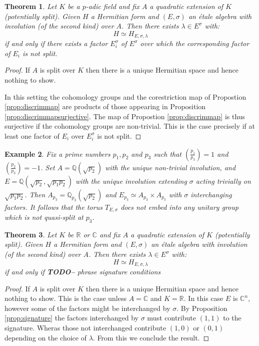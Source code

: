 \documentclass{article}
\theoremstyle{plain}
\newtheorem{theorem}{Theorem}[section]
\newtheorem{example}[theorem]{Example}
\theoremstyle{definition}
\numberwithin{equation}{section}
\newcommand{\RR}{\mathbb{R}}
\newcommand{\CC}{\mathbb{C}}
\newcommand{\QQ}{\mathbb{Q}}
\newcommand{\TODO}[1]{\textbf{TODO-#1}}
\begin{document}
\begin{theorem}
Let $K$ be a $p$-adic field and fix $A$ a quadratic extension of $K$ (potentially split).
Given $H$ a Hermitian form and $(E,\sigma)$ an \'etale algebra with involution (of the second kind) over $A$. Then there exists $\lambda \in E^\sigma$ with:
\[ H \simeq H_{E,\sigma,\lambda} \]
if and only if there exists a factor $E_i^\sigma$ of $E^\sigma$ over which the corresponding factor of $E_i$ is not split.
\end{theorem}
\begin{proof}
If $A$ is split over $K$ then there is a unique Hermitian space and hence nothing to show.

In this setting the cohomology groups and the corestriction map of Propostion \ref{prop:discrimmap} are products of those appearing in Proposition \ref{prop:discrimmapsurjective}. The map of Propostion \ref{prop:discrimmap} is thus surjective if the cohomology groups are non-trivial. This is the case precisely if at least one factor of $E_i$ over $E_i^\sigma$ is not split.
\end{proof}

\begin{example}
Fix a prime numbers $p_1,p_2$ and $p_3$ such that $\left(\tfrac{p_1}{p_3}\right) = 1$ and $\left(\tfrac{p_2}{p_3}\right) = -1$.
Set $A=\QQ(\sqrt{p_2})$ with the unique non-trivial involution, and $E=\QQ(\sqrt{p_2},\sqrt{p_1p_2})$ with the unique involution extending $\sigma$ acting trivially on $\sqrt{p_1p_2}$.
Then $A_{p_3} = \QQ_{p_3}(\sqrt{p_2})$ and $E_{p_3} \simeq A_{p_3} \times A_{p_3}$ with $\sigma$ interchanging factors.
It follows that the torus $T_{E,\sigma}$ does not embed into any unitary group which is not quasi-split at $p_3$.
\end{example}

\begin{theorem}
Let $K$ be $\RR$ or $\CC$ and fix $A$ a quadratic extension of $K$ (potentially split).
Given $H$ a Hermitian form and $(E,\sigma)$ an \'etale algebra with involution (of the second kind) over $A$. Then there exists $\lambda \in E^\sigma$ with:
\[ H \simeq H_{E,\sigma,\lambda} \]
if and only if 
\TODO - phrase signature conditions
\end{theorem}
\begin{proof}
If $A$ is split over $K$ then there is a unique Hermitian space and hence nothing to show.
This is the case unless $A=\CC$ and $K=\RR$. In this case $E$ is $\CC^n$, however some of the factors might be interchanged by $\sigma$.
By Proposition \ref{prop:signature} the factors interchanged by $\sigma$ must contribute $(1,1)$ to the signature.
Wheras those not interchanged contribute $(1,0)$ or $(0,1)$ depending on the choice of $\lambda$.
From this we conclude the result.
\end{proof}
\end{document}
